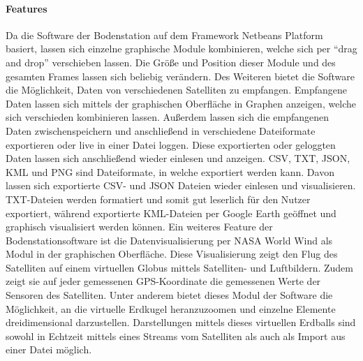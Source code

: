 \paragraph{Features}
Da die Software der Bodenstation auf dem Framework Netbeans Platform basiert, lassen sich einzelne graphische Module kombinieren, welche sich per ``drag and drop'' verschieben lassen. Die Größe und Position dieser Module und des gesamten Frames lassen sich beliebig verändern. Des Weiteren bietet die Software die Möglichkeit, Daten von verschiedenen Satelliten zu empfangen. Empfangene Daten lassen sich mittels der graphischen Oberfläche in Graphen anzeigen, welche sich verschieden kombinieren lassen. Außerdem lassen sich die empfangenen Daten zwischenspeichern und anschließend in verschiedene Dateiformate exportieren oder live in einer Datei loggen. Diese exportierten oder geloggten Daten lassen sich anschließend wieder einlesen und anzeigen. CSV, TXT, JSON, KML und PNG sind Dateiformate, in welche exportiert werden kann. Davon lassen sich exportierte CSV- und JSON Dateien wieder einlesen und visualisieren. TXT-Dateien werden formatiert und somit gut leserlich für den Nutzer exportiert, während exportierte KML-Dateien per Google Earth geöffnet und graphisch visualisiert werden können. Ein weiteres Feature der Bodenstationsoftware ist die Datenvisualisierung per NASA World Wind als Modul in der graphischen Oberfläche. Diese Visualisierung zeigt den Flug des Satelliten auf einem virtuellen Globus mittels Satelliten- und Luftbildern. Zudem zeigt sie auf jeder gemessenen GPS-Koordinate die gemessenen Werte der Sensoren des Satelliten. Unter anderem bietet dieses Modul der Software die Möglichkeit, an die virtuelle Erdkugel heranzuzoomen und einzelne Elemente dreidimensional darzustellen. Darstellungen mittels dieses virtuellen Erdballs sind sowohl in Echtzeit mittels eines Streams vom Satelliten als auch als Import aus einer Datei möglich.
